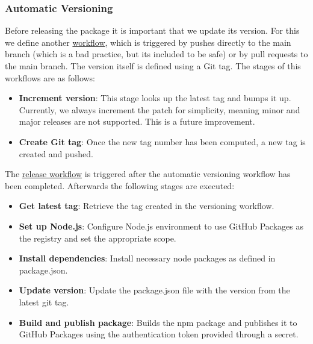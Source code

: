 \subsubsection{Automatic Versioning}
Before releasing the package it is important that we update its version. For this we define another {\color{blue}\href{https://github.com/remla24-team12/lib-version/blob/main/.github/workflows/version.yml}{workflow}}, which is triggered by pushes directly to the main branch (which is a bad practice, but its included to be safe) or by pull requests to the main branch. The version itself is defined using a Git tag. The stages of this workflows are as follows:
\begin{itemize}
    \item \textbf{Increment version}: This stage looks up the latest tag and bumps it up. Currently, we always increment the patch for simplicity, meaning minor and major releases are not supported. This is a future improvement.
    \item \textbf{Create Git tag}: Once the new tag number has been computed, a new tag is created and pushed. 
\end{itemize}

The {\color{blue}\href{https://github.com/remla24-team12/lib-version/blob/main/.github/workflows/release.yml}{release workflow}} is triggered after the automatic versioning workflow has been completed.
Afterwards the following stages are executed:
\begin{itemize}
    \item \textbf{Get latest tag}: Retrieve the tag created in the versioning workflow.
    \item \textbf{Set up Node.js}: Configure Node.js environment to use GitHub Packages as the registry and set the appropriate scope.
    \item \textbf{Install dependencies}: Install necessary node packages as defined in package.json.
    \item \textbf{Update version}: Update the package.json file with the version from the latest git tag.
    \item \textbf{Build and publish package}: Builds the npm package and publishes it to GitHub Packages using the authentication token provided through a secret.
\end{itemize}


